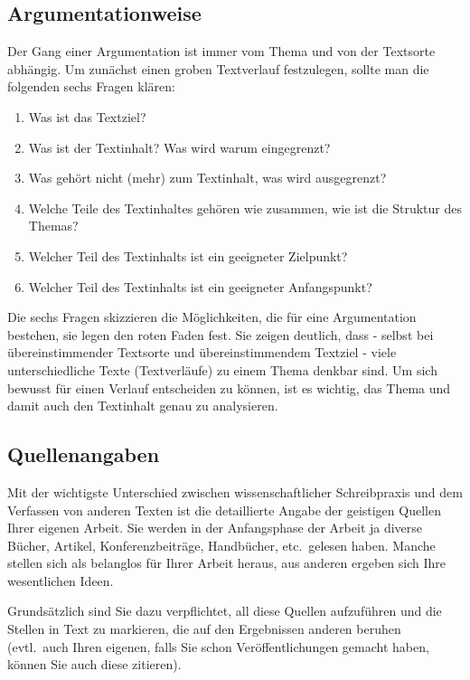 \subsection{Argumentationweise}

Der Gang einer Argumentation ist immer vom Thema und von der
Textsorte abhängig. Um zunächst einen groben Textverlauf
festzulegen, sollte man die folgenden sechs Fragen klären:

\begin{enumerate}
    \item Was ist das Textziel?
    \item Was ist der Textinhalt? Was wird warum eingegrenzt?
    \item Was gehört nicht (mehr) zum Textinhalt, was wird ausgegrenzt?
    \item Welche Teile des Textinhaltes gehören wie zusammen, wie ist die
        Struktur des Themas?
    \item Welcher Teil des Textinhalts ist ein geeigneter Zielpunkt?
    \item Welcher Teil des Textinhalts ist ein geeigneter
        Anfangspunkt?
\end{enumerate}

Die sechs Fragen skizzieren die Möglichkeiten, die für eine
Argumentation bestehen, sie legen den roten Faden fest. Sie zeigen
deutlich, dass - selbst bei übereinstimmender Textsorte und
übereinstimmendem Textziel - viele unterschiedliche Texte
(Textverläufe) zu einem Thema denkbar sind. Um sich bewusst für
einen Verlauf entscheiden zu können, ist es wichtig, das Thema und
damit auch den Textinhalt genau zu analysieren.


\subsection{Quellenangaben}


Mit der wichtigste Unterschied zwischen wissenschaftlicher
Schreibpraxis und dem Verfassen von anderen Texten ist die
detaillierte Angabe der geistigen Quellen Ihrer eigenen Arbeit.
Sie werden in der Anfangsphase der Arbeit ja diverse Bücher,
Artikel, Konferenzbeiträge, Handbücher, etc.\ gelesen haben.
Manche stellen sich als belanglos für Ihrer Arbeit heraus, aus
anderen ergeben sich Ihre wesentlichen Ideen.

Grundsätzlich sind Sie dazu verpflichtet, all diese Quellen
aufzuführen und die Stellen in Text zu markieren, die auf den
Ergebnissen anderen beruhen (evtl.\ auch Ihren eigenen, falls Sie
schon Veröffentlichungen gemacht haben, können Sie auch diese
zitieren).

